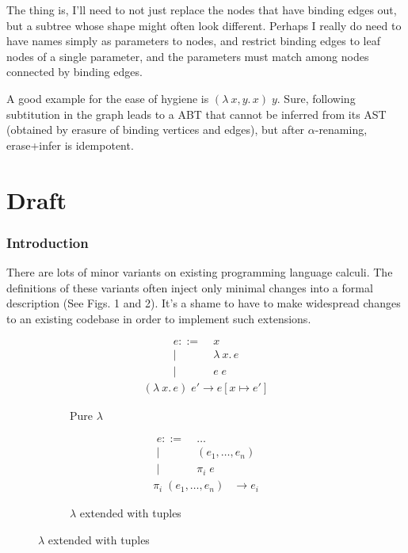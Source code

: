 \documentclass[11pt]{article} %
\theoremstyle{definition}
\newcommand{\fn}{\lambda\:\!}
\begin{document}
The thing is, I'll need to not just replace the nodes that have binding edges out, but a subtree whose shape might often look different.
Perhaps I really do need to have names simply as parameters to nodes, and restrict binding edges to leaf nodes of a single parameter, and the parameters must match among nodes connected by binding edges.

A good example for the ease of hygiene is $(\fn x,y.\,x)\;y$. Sure, following subtitution in the graph leads to a ABT that cannot be inferred from its AST (obtained by erasure of binding vertices and edges), but after $\alpha$-renaming, erase+infer is idempotent.


\part{Draft}

\section{Introduction}

There are lots of minor variants on existing programming language calculi.
The definitions of these variants often inject only minimal changes into a formal description (See Figs. 1 and 2).
It's a shame to have to make widespread changes to an existing codebase in order to implement such extensions.

\begin{figure}[H]
\centering
    \begin{subfigure}[t]{0.3\textwidth}
        \begin{align*}
            e ::=&\; x \\
              \mid&\; \fn x.\,e \\
              \mid&\; e\;e
        \end{align*}
        \begin{align*}
            (\fn x.\,e)\;e' \longrightarrow e[x \mapsto e']
        \end{align*}

    \caption{Pure $\lambda$}
    \end{subfigure}
    \begin{subfigure}[t]{0.3\textwidth}
        \begin{align*}
            e ::=&\; \ldots \\
              \mid&\; (e_1, \ldots, e_n) \\
              \mid&\; \pi_i\;e
        \end{align*}
        \begin{align*}
            \pi_i\;(e_1, \ldots, e_n) &\longrightarrow e_i
        \end{align*}
    \caption{$\lambda$ extended with tuples}
    \end{subfigure}
\end{figure}
\end{document}
